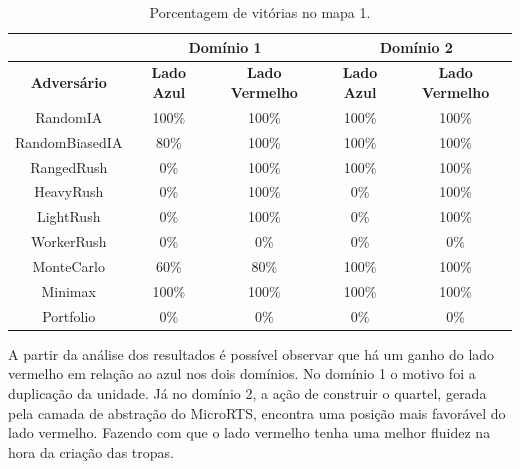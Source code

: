 \begin{table}[ht]
	\centering
	\caption{Porcentagem de vitórias no mapa 1.}
	\label{tab:mapa1}
	\begin{tabular}{|c|cc|cc|}
		\hline
		\textbf{}           & \multicolumn{2}{c|}{\textbf{Domínio 1}}  & \multicolumn{2}{c|}{\textbf{Domínio 2}}  \\ \hline
		\textbf{Adversário} & \textbf{Lado Azul} & \textbf{Lado Vermelho} & \textbf{Lado Azul} & \textbf{Lado Vermelho} \\ \hline
		RandomIA            & 100\%              & 100\%                  & 100\%              & 100\%                  \\ \hline
		RandomBiasedIA      & 80\%               & 100\%                  & 100\%              & 100\%                  \\ \hline
		RangedRush          & 0\%                & 100\%                  & 100\%              & 100\%                  \\ \hline
		HeavyRush           & 0\%                & 100\%                  & 0\%                & 100\%                  \\ \hline
		LightRush           & 0\%                & 100\%                  & 0\%                & 100\%                  \\ \hline
		WorkerRush          & 0\%                & 0\%                    & 0\%                & 0\%                    \\ \hline
		MonteCarlo          & 60\%               & 80\%                   & 100\%              & 100\%                  \\ \hline
		Minimax             & 100\%              & 100\%                  & 100\%              & 100\%                  \\ \hline
		Portfolio           & 0\%                & 0\%                    & 0\%                & 0\%                    \\ \hline
	\end{tabular}
\end{table}

A partir da análise dos resultados é possível observar que há um ganho do lado vermelho em relação ao azul nos dois domínios. 
No domínio 1 o motivo foi a duplicação da unidade.
Já no domínio 2, a ação de construir o quartel, gerada pela camada de abstração do MicroRTS, encontra uma posição mais favorável do lado vermelho.
Fazendo com que o lado vermelho tenha uma melhor fluidez na hora da criação das tropas.

